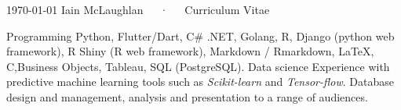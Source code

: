 \documentclass[11pt, a4paper]{awesome-cv}
\begin{document}
\makecvheader
\makecvfooter
  {\today}
  {Iain McLaughlan~~~·~~~Curriculum Vitae}
  {\thepage}
  




\begin{cvskills}
  \cvskill
    {Programming} %
    {Python, Flutter/Dart, C\# .NET, Golang, R, Django (python web framework), 
    R Shiny (R web framework), Markdown / Rmarkdown, LaTeX, C,\newline Business 
    Objects, Tableau, SQL (PostgreSQL).} %
  \cvskill
    {Data science}
    {Experience with predictive machine learning tools such as 
    \textit{Scikit-learn} and \textit{Tensor-flow}. Database design and 
    management, analysis and presentation to a range of audiences.}

\end{cvskills}




\end{document}
